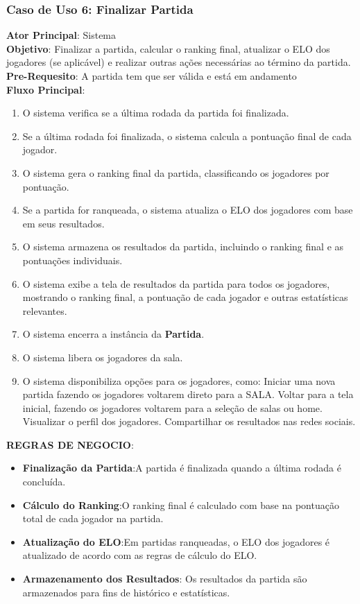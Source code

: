\subsubsection{Caso de Uso 6: Finalizar Partida}
    \textbf{Ator Principal}: Sistema \\
    \textbf{Objetivo}: Finalizar a partida, calcular o ranking final, atualizar o ELO dos jogadores (se aplicável) e realizar outras ações necessárias ao término da partida. \\
    \textbf{Pre-Requesito}: A partida tem que ser válida e está em andamento \\
    \textbf{Fluxo Principal}: \\
    \begin{enumerate}
        \item O sistema verifica se a última rodada da partida foi finalizada.
        \item Se a última rodada foi finalizada, o sistema calcula a pontuação final de cada jogador.
        \item O sistema gera o ranking final da partida, classificando os jogadores por pontuação.
        \item Se a partida for ranqueada, o sistema atualiza o ELO dos jogadores com base em seus resultados.
        \item O sistema armazena os resultados da partida, incluindo o ranking final e as pontuações individuais.
        \item O sistema exibe a tela de resultados da partida para todos os jogadores, mostrando o ranking final, a pontuação de cada jogador e outras estatísticas relevantes.
        \item O sistema encerra a instância da \textbf{Partida}.
        \item O sistema libera os jogadores da sala.
        \item O sistema disponibiliza opções para os jogadores, como:
            \subitem Iniciar uma nova partida fazendo os jogadores voltarem direto para a SALA.
            \subitem Voltar para a tela inicial, fazendo os jogadores voltarem para a seleção de salas ou home.
            \subitem Visualizar o perfil dos jogadores.
            \subitem Compartilhar os resultados nas redes sociais.
    \end{enumerate}
    
    \textbf{REGRAS DE NEGOCIO}:
    \begin{itemize}
        \item \textbf{Finalização da Partida}:A partida é finalizada quando a última rodada é concluída.
        \item \textbf{Cálculo do Ranking}:O ranking final é calculado com base na pontuação total de cada jogador na partida.
        \item \textbf{Atualização do ELO}:Em partidas ranqueadas, o ELO dos jogadores é atualizado de acordo com as regras de cálculo do ELO.
        \item \textbf{Armazenamento dos Resultados}: Os resultados da partida são armazenados para fins de histórico e estatísticas.
    \end{itemize}